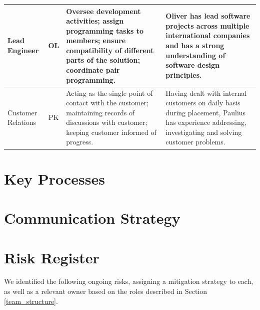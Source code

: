 \documentclass[twoside,a4paper,12pt]{article}
\begin{document}
\begin{table}[h!]
\begin{tabularx}{\textwidth}{|p{2cm}|c|Y|Y|}
		\hline
		Lead Engineer & 
		OL & 
		Oversee development activities; assign programming tasks to members; ensure compatibility of different parts of the solution; coordinate pair programming. & 
		Oliver has lead software projects across multiple international companies and has a strong understanding of software design principles.\\
		\hline
		Customer Relations & 
		PK & 
		Acting as the single point of contact with the customer; maintaining records of discussions with customer; keeping customer informed of progress. & 
		Having dealt with internal customers on daily basis during placement, Paulius has experience addressing, investigating and solving customer problems. \\
		\hline
		\end{tabularx}
	\end{table}
		
	\newpage
	\section{Key Processes}
	
	\newpage
	\section{Communication Strategy}
	
	\newpage
	\section{Risk Register}
	
	We identified the following ongoing risks, assigning a mitigation strategy to each, as well as a relevant owner based on the roles described in Section \ref{team_structure}.
	
\end{document}
